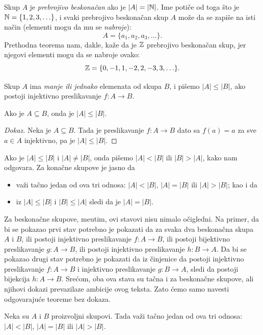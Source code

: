 Skup $A$ je \emph{prebrojivo beskona\v can} ako je $|A| = |\mathbb{N}|$. Ime poti\v ce od toga \v sto je $\mathbb{N} = \{1, 2, 3, \ldots\}$, i
svaki prebrojivo beskona\v can skup $A$ mo\v ze da se zapi\v se na isti na\v cin (elementi mogu da mu se \emph{nabroje}):
$$
  A = \{a_1, a_2, a_3, \ldots \}.
$$
Prethodna teorema nam, dakle, ka\v ze da je $\mathbb{Z}$ prebrojivo beskona\v can skup, jer njegovi elementi mogu da se nabroje ovako:
$$
  \mathbb{Z} = \{ 0, -1, 1, -2, 2, -3, 3, \ldots \}.
$$

\begin{DEF}
  Skup $A$ ima \emph{manje ili jednako} elemenata od skupa $B$, i pi\v semo $|A| \le |B|$, ako postoji injektivno
  preslikavanje $f : A \to B$.
\end{DEF}

\begin{THM}
  Ako je $A \subseteq B$, onda je $|A| \le |B|$.
\end{THM}
\begin{proof}[Dokaz]
  Neka je $A \subseteq B$. Tada je preslikavanje $f : A \to B$ dato sa $f(a) = a$ za sve $a \in A$ injektivno,
  pa je $|A| \le |B|$.
\end{proof}

Ako je $|A| \le |B|$ i $|A| \ne |B|$, onda pi\v semo $|A| < |B|$ ili $|B| > |A|$, kako nam odgovara.
Za kona\v cne skupove je jasno da
\begin{itemize}
\item
  va\v zi ta\v cno jedan od ova tri odnosa: $|A| < |B|$, $|A| = |B|$ ili $|A| > |B|$; kao i da
\item
  iz $|A| \le |B|$ i $|B| \le |A|$ sledi da je $|A| = |B|$.
\end{itemize}
Za beskona\v cne skupove, me\dj utim, ovi stavovi nisu nimalo o\v cigledni. Na primer,
da bi se pokazao prvi stav potrebno je pokazati da za svaka dva beskona\v cna skupa $A$ i $B$, ili postoji injektivno preslikavanje
$f : A \to B$, ili postoji bijektivno preslikavanje $g : A \to B$, ili postoji injektivno preslikavanje $h : B \to A$.
Da bi se pokazao drugi stav potrebno je pokazati da iz \v cinjenice
da postoji injektivno preslikavanje $f : A \to B$ i injektivno preslikavanje $g : B \to A$, sledi da postoji
bijekcija $h : A \to B$. Sre\'com, oba ova stava su ta\v cna i za beskona\v cne skupove, ali njihovi dokazi prevazilaze
ambicije ovog teksta. Zato \'cemo samo navesti odgovaraju\'ce teoreme bez dokaza.

\begin{THM}[Trihotomija]
  Neka su $A$ i $B$ proizvoljni skupovi. Tada va\v zi ta\v cno jedan od ova tri odnosa: $|A| < |B|$, $|A| = |B|$ ili $|A| > |B|$.
\end{THM}


